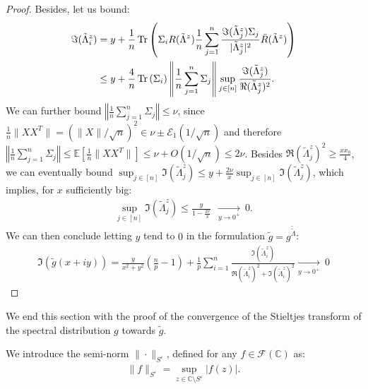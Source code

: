 \documentclass[a4papaer, titlepage]{book}
\begin{document}
\begin{proof}
  Besides, let us bound:
  \begin{align*}
    \Im(\tilde \Lambda^z_i) 
    &= y + \frac{1}{n} \operatorname{Tr} \left(\Sigma_iR(\tilde \Lambda^z) \frac{1}{n} \sum_{j=1}^n \frac{\Im(\tilde \Lambda^z_j)\Sigma_j}{|\tilde \Lambda^z_j|^2}\bar R(\tilde \Lambda^z)\right)\\
    &\leq y + \frac{4}{n} \operatorname{Tr} \left(\Sigma_i\right) \left\Vert \frac{1}{n} \sum_{j=1}^n \Sigma_j\right\Vert \sup_{j\in [n]}\frac{\Im(\tilde \Lambda^z_j)}{\Re(\tilde \Lambda^z_j)^2}.
  \end{align*}
  We can further bound $\left\Vert \frac{1}{n} \sum_{j=1}^n \Sigma_j\right\Vert \leq \nu$, since $\frac{1}{n}\|XX^T\| = (\|X\|/\sqrt n)^2 \in \nu \pm \mathcal E_1(1/\sqrt n)$ and therefore $\left\Vert \frac{1}{n} \sum_{j=1}^n \Sigma_j\right\Vert \leq \mathbb E [\frac{1}{n}\|XX^T\|] \leq \nu + O(1/\sqrt n) \leq 2 \nu$. Besides $\Re(\tilde \Lambda^z_j)^2 \geq \frac{x x_0}{4}$, we can eventually bound $\sup_{j\in [n]}\Im(\tilde \Lambda^z_j) \leq y + \frac{2\nu }{x}\sup_{j\in [n]}\Im(\tilde \Lambda^z_j)$, which implies, for $x$ sufficiently big:
  \begin{align*}
   \sup_{j\in [n]}\Im(\tilde \Lambda^z_j) \leq \frac{y}{1 - \frac{2\nu }{x}} \ \ \underset{y \to 0^+}{\longrightarrow} \ 0.
  \end{align*}
  We can then conclude letting $y$ tend to $0$ in the formulation $\tilde g = g^{\tilde \tilde \Lambda}$:
  \begin{align*}
    \Im(\tilde g(x+iy)) = \frac{y}{x^2 + y^2} \left(\frac{n}{p} - 1\right) + \frac{1}{p} \sum_{i=1}^n\frac{\Im(\tilde \Lambda_i^z)}{\Re(\tilde \Lambda_i^z)^2 + \Im(\tilde \Lambda_i^z)^2}\underset{y \to 0^+}{\longrightarrow} \ 0
  \end{align*}
\end{proof}

We end this section with the proof of the convergence of the Stieltjes transform of the spectral distribution $g$ towards $\tilde g$.

We introduce the semi-norm $\| \cdot \|_{S^\varepsilon}$, defined for any $f \in \mathcal F(\mathbb C)$ as:
  \begin{align*}
    \| f \|_{S^\varepsilon} = \sup_{z \in \mathbb C \setminus S^\varepsilon} |f(z)|.
  \end{align*}
\end{document}
